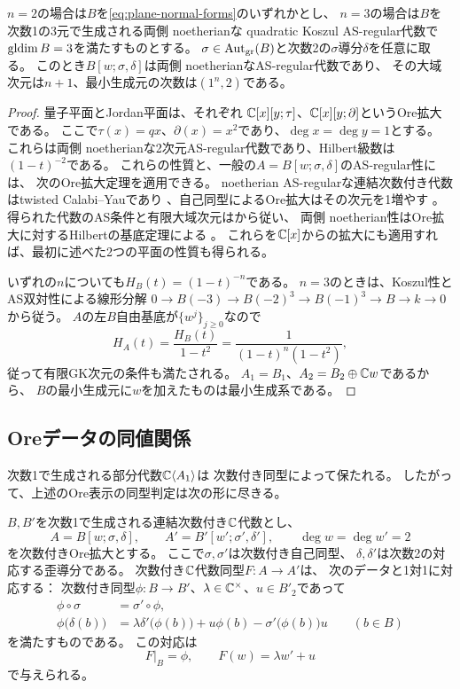 \begin{corollary}
\label{cor:lowdim-converse}
$n=2$の場合は$B$を\eqref{eq:plane-normal-forms}のいずれかとし、
$n=3$の場合は$B$を次数1の3元で生成される両側 noetherianな
quadratic Koszul AS-regular代数で$\operatorname{gldim} B=3$を満たすものとする。
$\sigma\in\operatorname{Aut}_{\mathrm{gr}}(B)$と次数2の$\sigma$導分$\delta$を任意に取る。
このとき$B[w;\sigma,\delta]$は両側 noetherianなAS-regular代数であり、
その大域次元は$n+1$、最小生成元の次数は$(1^n,2)$である。
\end{corollary}

\begin{proof}
量子平面とJordan平面は、それぞれ
$\mathbb C[x][y;\tau]$、$\mathbb C[x][y;\partial]$というOre拡大である。
ここで$\tau(x)=qx$、$\partial(x)=x^2$であり、$\deg x=\deg y=1$とする。
これらは両側 noetherianな2次元AS-regular代数であり、Hilbert級数は$(1-t)^{-2}$である。
これらの性質と、一般の$A=B[w;\sigma,\delta]$のAS-regular性には、
次のOre拡大定理を適用できる。
noetherian AS-regularな連結次数付き代数はtwisted Calabi--Yauであり
\cite[\S 1.2]{LWW}、自己同型によるOre拡大はその次元を1増やす
\cite[Theorem 3.3]{LWW}。
得られた代数のAS条件と有限大域次元は\cite[Lemma 1.3]{LWW}から従い、
両側 noetherian性はOre拡大に対するHilbertの基底定理による
\cite[\S 1.3]{LWW}。
これらを$\mathbb C[x]$からの拡大にも適用すれば、最初に述べた2つの平面の性質も得られる。

いずれの$n$についても$H_B(t)=(1-t)^{-n}$である。
$n=3$のときは、Koszul性とAS双対性による線形分解
$0\to B(-3)\to B(-2)^3\to B(-1)^3\to B\to k\to0$から従う。
$A$の左$B$自由基底が$\{w^j\}_{j\geq0}$なので
\[
  H_A(t)=\frac{H_B(t)}{1-t^2}
        =\frac{1}{(1-t)^n(1-t^2)},
\]
従って有限GK次元の条件も満たされる。
$A_1=B_1$、$A_2=B_2\oplus\mathbb C w$であるから、
$B$の最小生成元に$w$を加えたものは最小生成系である。
\end{proof}

\subsection{Oreデータの同値関係}

次数1で生成される部分代数$\mathbb C\langle A_1\rangle$は
次数付き同型によって保たれる。
したがって、上述のOre表示の同型判定は次の形に尽きる。

\begin{proposition}
\label{prop:ore-isomorphism}
$B,B'$を次数1で生成される連結次数付き$\mathbb C$代数とし、
\[
  A=B[w;\sigma,\delta],\qquad
  A'=B'[w';\sigma',\delta'],\qquad
  \deg w=\deg w'=2
\]
を次数付きOre拡大とする。
ここで$\sigma,\sigma'$は次数付き自己同型、
$\delta,\delta'$は次数2の対応する歪導分である。
次数付き$\mathbb C$代数同型$F:A\to A'$は、
次のデータと1対1に対応する：
次数付き同型$\phi:B\to B'$、$\lambda\in\mathbb C^\times$、$u\in B'_2$であって
\begin{align}
  \phi\circ\sigma&=\sigma'\circ\phi,
  \label{eq:ore-iso-sigma}\\
  \phi\bigl(\delta(b)\bigr)
    &=\lambda\delta'\bigl(\phi(b)\bigr)
      +u\phi(b)-\sigma'\bigl(\phi(b)\bigr)u
      \qquad(b\in B)
  \label{eq:ore-iso-delta}
\end{align}
を満たすものである。
この対応は
\[
  F|_B=\phi,\qquad F(w)=\lambda w'+u
\]
で与えられる。
\end{proposition}

